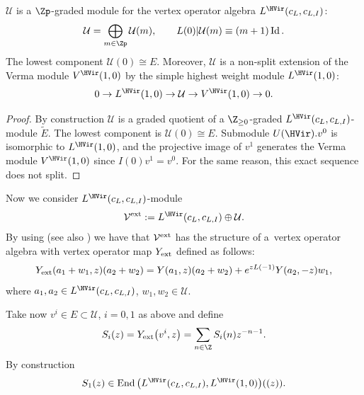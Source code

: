 \begin{Proposition}
$\mathcal U$ is a $\Zp$-graded module for the vertex operator algebra $L^{\HVir} (c_L, c_{L,I} )$:
\begin{gather*}
\mathcal U = \bigoplus _{m \in {\Zp} } \mathcal U (m), \qquad L(0) \vert \mathcal U(m) \equiv (m+1) \operatorname{Id}.
\end{gather*}
The lowest component $\mathcal U (0) \cong E$. Moreover, $\mathcal U$ is a non-split extension of the Verma module $V^{\HVir} (1,0)$ by the simple highest weight module $L^{\HVir} (1,0)$:
 \begin{gather*}
 0 \rightarrow L^{\HVir} (1,0) \rightarrow \mathcal U \rightarrow V^{\HVir} (1,0 ) \rightarrow 0.
 \end{gather*}
 \end{Proposition}
 \begin{proof}
By construction $\mathcal U $ is a graded quotient of a $\Z_{\ge 0}$-graded $L^{\HVir}(c_L, c_{L,I})$-module $\widetilde E$. The lowest component is $\mathcal U (0) \cong E$. Submodule $U(\HVir).v^0$ is isomorphic to $L^{\HVir}(1,0)$, and the projective image of $v^1$ generates the Verma module $V^{\HVir}(1,0)$ since $I(0)v^1=v^0$. For the same reason, this exact sequence does not split.
\end{proof}

Now we consider $L^{\HVir}(c_L, c_{L,I} )$-module
\begin{gather*}
\mathcal V^{\rm ext}:= L^{\HVir}(c_L, c_{L,I} ) \oplus \mathcal U.
\end{gather*}
By using \cite[Theorem 4.8.1]{LL} (see also \cite{AdM-selecta,Li1}) we have that $ \mathcal V^{\rm ext}$ has the structure of a~vertex operator algebra with vertex operator map $Y_{\rm ext}$ def\/ined as follows:{\samepage
\begin{gather*}
Y_{\rm ext} ( a_1 + w_1 , z ) (a_2 + w_2) = Y(a_1, z) (a_2+w_2) + e^{z L(-1)} Y (a_2 ,-z ) w_1,
\end{gather*}
where $a_1, a_2 \in L^{\HVir}(c_L, c_{L,I} )$, $ w_1, w_2 \in \mathcal U$.}

Take now $v^ i \in E \subset \mathcal U$, $i=0,1$ as above and def\/ine
\begin{gather*}
S_i (z) = Y_{\rm ext} \big(v^i, z\big) = \sum _{n \in \Z} S_i (n) z^{-n-1}.
\end{gather*}
By construction
\begin{gather*}
S_1 (z) \in \operatorname{End} \big( L^{\HVir} (c_L,c_{L,I}), L^{\HVir}(1,0) \big) ((z)).
\end{gather*}

